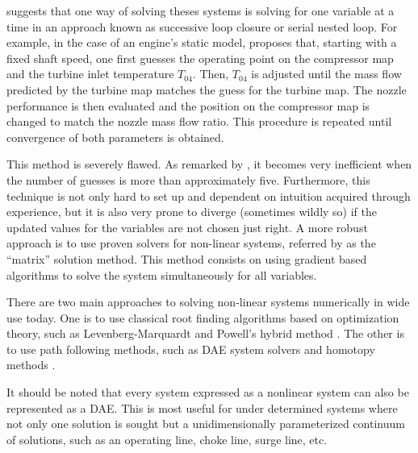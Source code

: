 \textcite{walsh2004gas} suggests that one way of solving theses systems is solving for one variable at a time in an approach known as successive loop closure or serial nested loop. 
For example, in the case of an engine's static model, \textcite{walsh2004gas} proposes that, starting with a fixed shaft speed, one first guesses the operating point on the compressor map and the turbine inlet temperature $T_{04}$. Then, $T_04$ is adjusted until the mass flow predicted by the turbine map matches the guess for the turbine map. The nozzle performance is then evaluated and the position on the compressor map is changed to match the nozzle mass flow ratio. This procedure is repeated until convergence of both parameters is obtained.

This method is severely flawed. As remarked by \textcite{walsh2004gas}, it becomes very inefficient when the number of guesses is more than approximately five. Furthermore, this technique is not only hard to set up and dependent on intuition acquired through experience, but it is also very prone to diverge (sometimes wildly so) if the updated values for the variables are not chosen just right. A more robust approach is to use proven solvers for non-linear systems, referred by \textcite{walsh2004gas} as the ``matrix'' solution method. 
This method consists on using gradient based algorithms to solve the system simultaneously for all variables.

There are two main approaches to solving non-linear systems numerically in wide use today. 
One is to use classical root finding algorithms based on optimization theory, such as Levenberg-Marquardt and Powell's hybrid method \cite{minpack}.
The other is to use path following methods, such as
\ac{DAE} system solvers and homotopy methods \cite{Allgower1997,Rabier2002,hompack,sundials}. 

It should be noted that every system expressed as a nonlinear system can also be represented as a \ac{DAE}. 
This is most useful for under determined systems where not only one solution is sought 
but a unidimensionally parameterized continuum of solutions, such as an operating line, 
choke line, surge line, etc.

